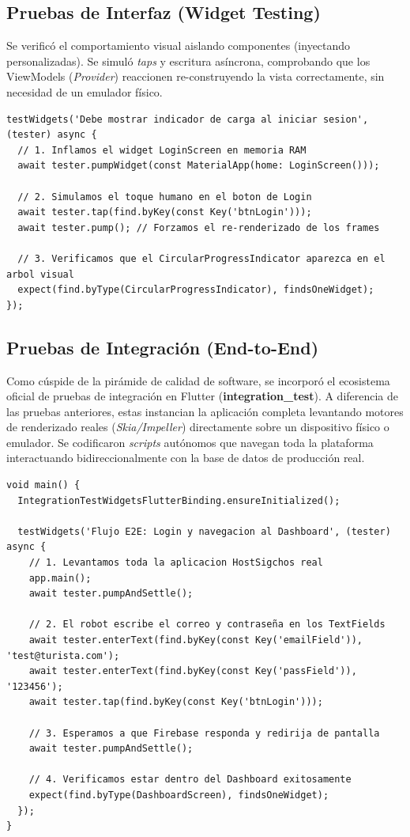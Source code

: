 \documentclass[12pt,letterpaper]{report}
\newcommand{\tech}[1]{\textbf{#1}}
\newcommand{\pathtext}[1]{\texttt{\detokenize{#1}}}
\begin{document}
\subsection{Pruebas de Interfaz (Widget Testing)}
Se verificó el comportamiento visual aislando componentes (inyectando \pathtext{Keys} personalizadas). Se simuló \textit{taps} y escritura asíncrona, comprobando que los ViewModels (\textit{Provider}) reaccionen re-construyendo la vista correctamente, sin necesidad de un emulador físico.

\begin{lstlisting}[style=codeblock,caption={Ejemplo de Widget Test verificando el renderizado condicional.}]
testWidgets('Debe mostrar indicador de carga al iniciar sesion', (tester) async {
  // 1. Inflamos el widget LoginScreen en memoria RAM
  await tester.pumpWidget(const MaterialApp(home: LoginScreen()));

  // 2. Simulamos el toque humano en el boton de Login
  await tester.tap(find.byKey(const Key('btnLogin')));
  await tester.pump(); // Forzamos el re-renderizado de los frames

  // 3. Verificamos que el CircularProgressIndicator aparezca en el arbol visual
  expect(find.byType(CircularProgressIndicator), findsOneWidget);
});
\end{lstlisting}

\subsection{Pruebas de Integración (End-to-End)}
Como cúspide de la pirámide de calidad de software, se incorporó el ecosistema oficial de pruebas de integración en Flutter (\tech{integration\_test}). A diferencia de las pruebas anteriores, estas instancian la aplicación completa levantando motores de renderizado reales (\textit{Skia/Impeller}) directamente sobre un dispositivo físico o emulador. Se codificaron \textit{scripts} autónomos que navegan toda la plataforma interactuando bidireccionalmente con la base de datos de producción real.

\begin{lstlisting}[style=codeblock,caption={Ejemplo de Prueba de Integracion E2E controlando el dispositivo real.}]
void main() {
  IntegrationTestWidgetsFlutterBinding.ensureInitialized();

  testWidgets('Flujo E2E: Login y navegacion al Dashboard', (tester) async {
    // 1. Levantamos toda la aplicacion HostSigchos real
    app.main();
    await tester.pumpAndSettle();

    // 2. El robot escribe el correo y contraseña en los TextFields
    await tester.enterText(find.byKey(const Key('emailField')), 'test@turista.com');
    await tester.enterText(find.byKey(const Key('passField')), '123456');
    await tester.tap(find.byKey(const Key('btnLogin')));

    // 3. Esperamos a que Firebase responda y redirija de pantalla
    await tester.pumpAndSettle();

    // 4. Verificamos estar dentro del Dashboard exitosamente
    expect(find.byType(DashboardScreen), findsOneWidget);
  });
}
\end{lstlisting}
\end{document}
